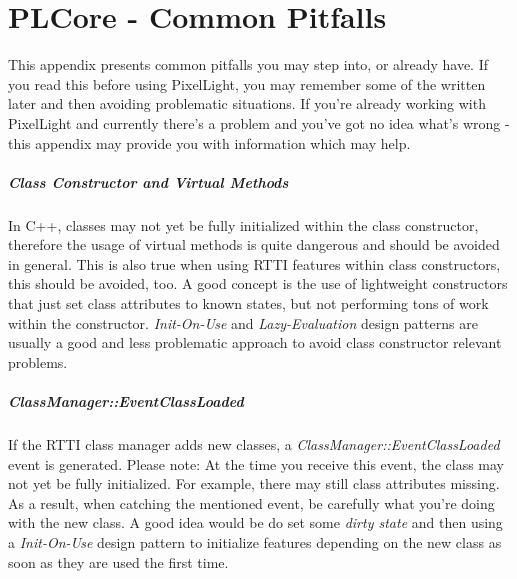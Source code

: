 \chapter{PLCore - Common Pitfalls}
\label{Appendix:CommonPitfalls}
This appendix presents common pitfalls you may step into, or already have. If you read this before using PixelLight, you may remember some of the written later and then avoiding problematic situations. If you're already working with PixelLight and currently there's a problem and you've got no idea what's wrong - this appendix may provide you with information which may help.


\paragraph{Class Constructor and Virtual Methods}
In C++, classes may not yet be fully initialized within the class constructor, therefore the usage of virtual methods is quite dangerous and should be avoided in general. This is also true when using \ac{RTTI} features within class constructors, this should be avoided, too. A good concept is the use of lightweight constructors that just set class attributes to known states, but not performing tons of work within the constructor. \emph{Init-On-Use} and \emph{Lazy-Evaluation} design patterns are usually a good and less problematic approach to avoid class constructor relevant problems.


\paragraph{ClassManager::EventClassLoaded}
If the \ac{RTTI} class manager adds new classes, a \emph{ClassManager::EventClassLoaded} event is generated. Please note: At the time you receive this event, the class may not yet be fully initialized. For example, there may still class attributes missing. As a result, when catching the mentioned event, be carefully what you're doing with the new class. A good idea would be do set some \emph{dirty state} and then using a \emph{Init-On-Use} design pattern to initialize features depending on the new class as soon as they are used the first time.


